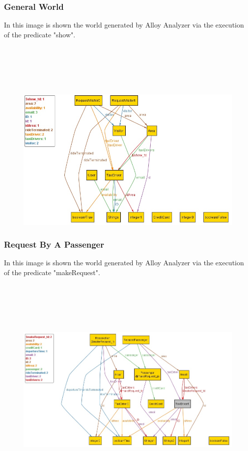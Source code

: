 \documentclass[18pt,oneside,a4paper, titlepage]{article}
\begin{document}
		\subsubsection{General World}
		In this image is shown the world generated by Alloy Analyzer via the
		execution of the predicate "show".
		\\ \\ \\ \\ \\ \\
			\begin{figure}[h]
				\includegraphics[scale=0.7]{show.jpg}
			\end{figure}
\newpage
		\subsubsection{Request By A Passenger}
		In this image is shown the world generated by Alloy Analyzer via the
		execution of the predicate "makeRequest".
		\\ \\ \\ \\ \\ \\
		\begin{figure}[h]
			\includegraphics[scale=0.6]{makeRequest.jpg}
		\end{figure}
\newpage
\end{document}
